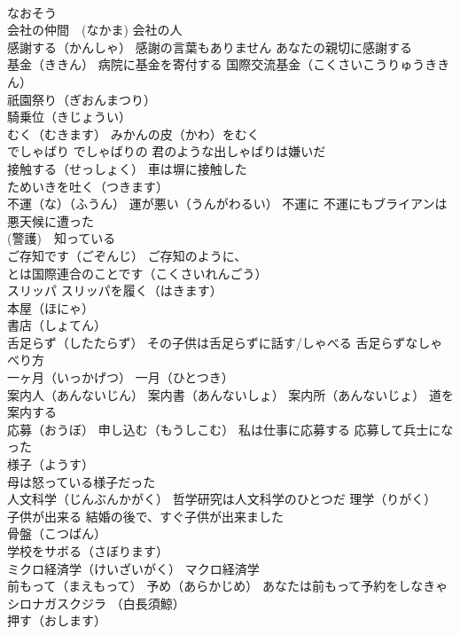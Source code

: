 \documentclass[8pt]{extreport}
\begin{document}
\begin{CJK}{UTF8}{min}
\\	なおそう
\\	会社の仲間　(なかま) 会社の人
\\	感謝する（かんしゃ） 感謝の言葉もありません あなたの親切に感謝する
\\	基金（ききん） 病院に基金を寄付する 国際交流基金（こくさいこうりゅうききん）
\\	祇園祭り（ぎおんまつり）
\\	騎乗位（きじょうい）
\\	むく（むきます） みかんの皮（かわ）をむく
\\	でしゃばり でしゃばりの 君のような出しゃばりは嫌いだ
\\	接触する（せっしょく） 車は塀に接触した
\\	ためいきを吐く（つきます）
\\	不運（な）（ふうん） 運が悪い（うんがわるい） 不運に 不運にもブライアンは悪天候に遭った
\\	(警護)　知っている 
\\	ご存知です（ごぞんじ） ご存知のように、
\\	とは国際連合のことです（こくさいれんごう）
\\	スリッパ スリッパを履く（はきます）
\\	本屋（ほにゃ）
\\	書店（しょてん）
\\	舌足らず（したたらず） その子供は舌足らずに話す/しゃべる 舌足らずなしゃべり方
\\	一ヶ月（いっかげつ） 一月（ひとつき）
\\	案内人（あんないじん） 案内書（あんないしょ） 案内所（あんないじょ） 道を案内する
\\	応募（おうぼ） 申し込む（もうしこむ） 私は仕事に応募する 応募して兵士になった
\\	様子（ようす） 
\\	母は怒っている様子だった
\\	人文科学（じんぶんかがく） 哲学研究は人文科学のひとつだ 理学（りがく）
\\	子供が出来る 結婚の後で、すぐ子供が出来ました
\\	骨盤（こつばん）
\\	学校をサボる（さぼります）
\\	ミクロ経済学（けいざいがく） マクロ経済学
\\	前もって（まえもって） 予め（あらかじめ） あなたは前もって予約をしなきゃ
\\	シロナガスクジラ （白長須鯨）
\\	押す（おします）

\end{CJK}
\end{document}
